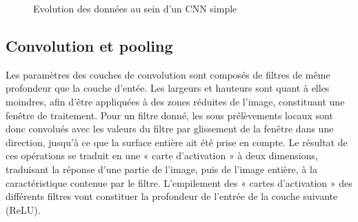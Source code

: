\documentclass[12pt]{report}
\begin{document}
\begin{figure}[H]
    \centering
    \caption{Evolution des données au sein d'un \gls{CNN} simple}
    \label{fig:c1p3s1}
\end{figure}



\subsection{Convolution et pooling}
Les paramètres des couches de convolution sont composés de filtres de même profondeur que la couche d’entée.
Les largeurs et hauteurs sont quant à elles moindres, afin d’être appliquées à des zones réduites de l’image, constituant une fenêtre de traitement.
Pour un filtre donné, les sous prélèvements locaux sont donc convolués avec les valeurs du filtre par glissement de la fenêtre dans une direction, jusqu’à ce que la surface entière ait été prise en compte.
Le résultat de ces opérations se traduit en une « carte d’activation » à deux dimensions, traduisant la réponse d’une partie de l’image, puis de l’image entière, à la caractéristique contenue par le filtre.
L’empilement des « cartes d’activation » des différents filtres vont constituer la profondeur de l’entrée de la couche suivante (ReLU).
\end{document}
